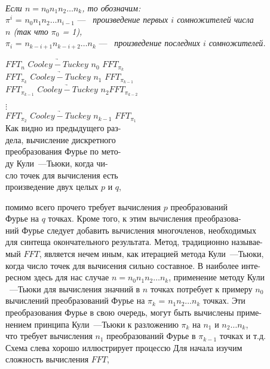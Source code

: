 \documentclass{mai_book}
\begin{document}
\\
\noindent\textit{Если $n=n_0n_1n_2\ldots n_k$, то обозначим:}\\ 
\indent $\pi^i$ = ${n_0}{n_1}{n_2}\ldots {n_{i-1}}$  —~ \textit{произведение первых $i$ сомножителей числа \\ $n$ (так что $\pi_0$ = 1),} \\
\indent $\pi_i$ = $n_{k-i+1}n_{k-i+2} \ldots n_k$ —~ \textit{произведение последних $i$ сомножителей.}\\
\begin{multicols}{2}
\noindent $FFT_n$ $\underrightarrow{Cooley-Tuckey}$ $n_0$ $FFT_{\pi_k}$\\
$FFT_{\pi_k}$ $\underrightarrow{Cooley-Tuckey}$ $n_1$ $FFT_{\pi_{k-1}}$\\
$FFT_{\pi_{k-1}}$ $\underrightarrow{Cooley-Tuckey}$ $n_2 FFT_{\pi_{k-2}}$

\hspace{2cm}
$\vdots$\\ 
$FFT_{\pi_2}$ $\underrightarrow{Cooley-Tuckey}$ $n_{k-1}$ $FFT_{\pi_1}$\\
Как видно из предыдущего раз-\\дела, вычисление дискретного\\ преобразования Фурье по мето-\\ду Кули~---Тьюки, когда чи-\\сло точек для вычисления есть \\ произведение двух целых $p$ и $q$,
\end{multicols}	
		\noindent помимо всего прочего требует вычисления $p$ преобразований \\
		\noindent Фурье на $q$ точках. Кроме того, к этим вычисления преобразова-\\ний Фурье следует добавить вычисления многочленов, необходимых \\ для синтеща окончательного результата. Метод, традиционно называе-\\мый $FFT$,
		\normalsize является нечем иным, как итерацией метода Кули~---Тьюки,\\ когда число точек для вычисения сильно составное. В наиболее инте-\\ресном здесь для нас случае $n=n_0n_1n_2\ldots n_k$, применение методу Кули\\ ~---Тьюки для вычисления значний в $n$ точках потребует к примеру $n_0$ вычислений преобразований Фурье на $\pi_k$ = $n_1n_2\ldots n_k$ точках. Эти \\ преобразования Фурье в свою очередь, могут быть вычислены приме-\\ нением принципа Кули~---Тьюки к разложению $\pi_k$ на $n_1$ и $n_2\ldots n_k$, \\ что требует вычисления $n_1$ преобразований Фурье в $\pi_{k-1}$ точках и т.д.\\ Схема слева хорошо иллюстрирует процессю Для начала изучим\\ сложность вычисления $FFT$, 
\end{document}
